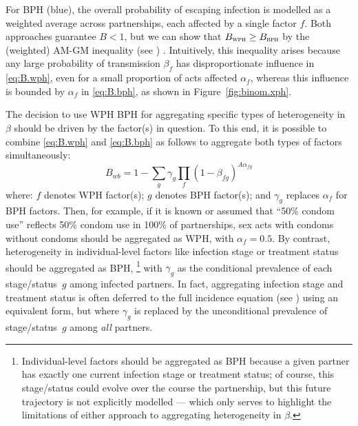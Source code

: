 For BPH (blue), the overall probability of escaping infection is modelled as
a weighted average across partnerships, each affected by a single factor $f$.
Both approaches guarantee $B < 1$,
but we can show that $B_{\textsc{wph}} \ge B_{\textsc{bph}}$
by the (weighted) AM-GM inequality (see ) \cite{Aldaz2009}.
Intuitively, this inequality arises because
any large probability of transmission $\beta_f$
has disproportionate influence in \eqref{eq:B.wph},
even for a small proportion of acts affected $\alpha_f$,
whereas this influence is bounded by $\alpha_f$ in \eqref{eq:B.bph},
as shown in Figure~\ref{fig:binom.xph}.
\par
The decision to use WPH \vs BPH for aggregating specific types of heterogeneity in $\beta$
should be driven by the factor(s) in question.
To this end, it is possible to combine \eqref{eq:B.wph} and \eqref{eq:B.bph} as follows
to aggregate both types of factors simultaneously:
\begin{equation}\label{eq:B.xph}
  B_{wb} = 1 - \sum_g \gamma_g \prod_f {(1 - \beta_{fg})}^{A\alpha_{fg}}
\end{equation} where:
$f$ denotes WPH factor(s);
$g$ denotes BPH factor(s); and
$\gamma_g$ replaces $\alpha_f$ for BPH factors.
Then, for example, if it is known or assumed that
``50\% condom use'' reflects 50\% condom use in 100\% of partnerships,
sex acts with condoms \vs without condoms
should be aggregated as WPH, with $\alpha_f = 0.5$.
By contrast, heterogeneity in individual-level factors like infection stage or treatment status
should be aggregated as BPH,%
\footnote{\label{foot:xph.future}
  Individual-level factors should be aggregated as BPH because
  a given partner has exactly one current infection stage or treatment status;
  of course, this stage/status could evolve over the course the partnership,
  but this future trajectory is not explicitly modelled
  --- which only serves to highlight the limitations of
  either approach to aggregating heterogeneity in $\beta$.}
with $\gamma_g$ as the conditional prevalence of each stage/status~$g$ among infected partners.
In fact, aggregating infection stage and treatment status is often deferred to
the full incidence equation (see ) using an equivalent form,
but where $\gamma_g$ is replaced by
the unconditional prevalence of stage/status~$g$ among \emph{all} partners.
